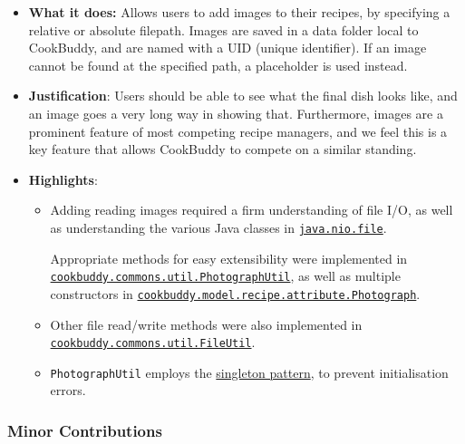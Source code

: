\documentclass[11pt,british]{article}
\begin{document}
\begin{itemize}
    \item \textbf{What it does:} Allows users to add images to their recipes, by specifying a relative or absolute
    filepath. Images are saved in a data folder local to CookBuddy, and are named with a
    UID (unique identifier). If an image cannot be found at the specified path, a placeholder is used instead.

    \item \textbf{Justification}: Users should be able to see what the final dish looks
    like, and an image goes a very long way in showing that. Furthermore, images are a prominent feature of most competing recipe managers, and we feel this is a key feature that allows CookBuddy to compete on a similar standing.

    \item \textbf{Highlights}:
    \begin{itemize}
    	\item Adding reading images required a firm understanding of file I/O, as well as understanding the various Java classes in \href{https://docs.oracle.com/en/java/javase/13/docs/api/java.base/java/nio/file/package-summary.html}{\texttt{java.nio.file}}.

    	Appropriate methods for easy extensibility were implemented in \href{https://github.com/AY1920S2-CS2103T-W12-4/main/blob/master/src/main/java/cookbuddy/commons/util/PhotographUtil.java}{\texttt{cookbuddy.commons.util.PhotographUtil}}, as well as multiple constructors in \href{https://github.com/AY1920S2-CS2103T-W12-4/main/blob/master/src/main/java/cookbuddy/model/recipe/attribute/Photograph.java}{\texttt{cookbuddy.model.recipe.attribute.Photograph}}.

    	\item Other file read/write methods were also implemented in \href{https://github.com/AY1920S2-CS2103T-W12-4/main/blob/master/src/main/java/cookbuddy/commons/util/FileUtil.java}{\texttt{cookbuddy.commons.util.FileUtil}}.

    	\item \texttt{PhotographUtil} employs the \href{https://en.wikipedia.org/wiki/Singleton_pattern}{singleton pattern}, to prevent initialisation errors.
    \end{itemize}
\end{itemize}

\subsubsection{Minor Contributions}
\end{document}

